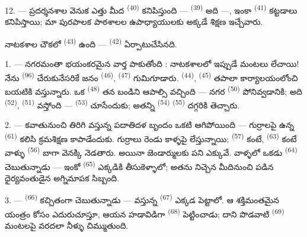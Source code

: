 12. --- ప్రదర్శనశాల వెనుక ఎత్తు మీద  \textsuperscript{(40)} కనిపిస్తుంది
—  \textsuperscript{(39)} అది —, ఇంకా
 \textsuperscript{(41)} కట్టడాలు కనిపిస్తాయి; మా పురపాలక
పాఠశాలల ఉపాధ్యాయులకు అక్కడే శిక్షణ ఇచ్చేవారు.

నాటకశాల చౌకలో  \textsuperscript{(43)} ఉంది —
 \textsuperscript{(42)} ఏర్పాటుచేసినది.

\VUsaut{6.0mm}
\VUsaut{3.0mm}

\VUsaut{3.4mm}

1. --- నగరమంతా భయంకరమైన వార్త పాకుతోంది : నాటకశాలలో ఇప్పుడే మంటలు లేచాయి! నేను
 \textsuperscript{(96)} చేరుకునేసరికే జనం 
\textsuperscript{(46)},  \textsuperscript{(47)} గుమిగూడారు.
 \textsuperscript{(44)}, 
\textsuperscript{(45)} తపాలా కార్యాలయంలోంచి బయటికి వస్తున్నారు. ఒక
 \textsuperscript{(48)} తన బండిని ఆపాల్సి వచ్చింది — నగర
 \textsuperscript{(50)} పోనివ్వడానికి; అది
 \textsuperscript{(52)},  \textsuperscript{(51)}
వస్తోంది —  \textsuperscript{(53)} చూసేందుకు; అతన్ని
 \textsuperscript{(54)} 
\textsuperscript{(55)} దగ్గరికి తెచ్చారు.

2. --- కవాతునుంచి తిరిగి వస్తున్న పదాతిదళ బృందం ఒకటి ఆగిపోయింది — గుర్రాలపై ఉన్న
 \textsuperscript{(61)} కలిసి క్రమశిక్షణ కాపాడేందుకు.
 గుర్రాలు రెండు కాళ్ళపై లేస్తున్నాయి; 
\textsuperscript{(57)} కంటే,  \textsuperscript{(63)} కంటే వాళ్ళు
 \textsuperscript{(56)} బాగా వెనక్కి నెడతారు. అయినా జెండార్ములకు పని
ఎక్కువే. వాళ్ళలో ఒకడు  \textsuperscript{(64)} చెబుతున్నాడు —
ఇంకో  \textsuperscript{(65)} ఎక్కడికి తీసుకెళ్ళాలో; అతను నిచ్చెన
మీదినుంచి పడిన ధైర్యవంతుడైన అగ్నిమాపక సిబ్బంది.

3. ---  \textsuperscript{(66)} కచ్చితంగా చెబుతున్నాడు — వస్తున్న
 \textsuperscript{(67)} ఎక్కడ పెట్టాలో. ఆ శక్తిమంతమైన యంత్రం కోసం
ఎదురుచూస్తూ, ఆయన హడావిడిగా  \textsuperscript{(68)} పెట్టించాడు; దాని
పొడవాటి  \textsuperscript{(69)} మంటలపై వరదలా నీళ్ళు చిమ్ముతుంది.

